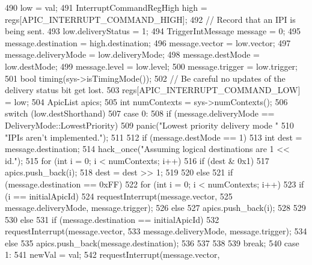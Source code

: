 \begin{DoxyCode}
{{{490             low = val;
491             InterruptCommandRegHigh high = regs[APIC_INTERRUPT_COMMAND_HIGH];
492             // Record that an IPI is being sent.
493             low.deliveryStatus = 1;
494             TriggerIntMessage message = 0;
495             message.destination = high.destination;
496             message.vector = low.vector;
497             message.deliveryMode = low.deliveryMode;
498             message.destMode = low.destMode;
499             message.level = low.level;
500             message.trigger = low.trigger;
501             bool timing(sys->isTimingMode());
502             // Be careful no updates of the delivery status bit get lost.
503             regs[APIC_INTERRUPT_COMMAND_LOW] = low;
504             ApicList apics;
505             int numContexts = sys->numContexts();
506             switch (low.destShorthand) {
507               case 0:
508                 if (message.deliveryMode == DeliveryMode::LowestPriority) {
509                     panic("Lowest priority delivery mode "
510                             "IPIs aren't implemented.\n");
511                 }
512                 if (message.destMode == 1) {
513                     int dest = message.destination;
514                     hack_once("Assuming logical destinations are 1 << id.\n");
515                     for (int i = 0; i < numContexts; i++) {
516                         if (dest & 0x1)
517                             apics.push_back(i);
518                         dest = dest >> 1;
519                     }
520                 } else {
521                     if (message.destination == 0xFF) {
522                         for (int i = 0; i < numContexts; i++) {
523                             if (i == initialApicId) {
524                                 requestInterrupt(message.vector,
525                                         message.deliveryMode, message.trigger);
526                             } else {
527                                 apics.push_back(i);
528                             }
529                         }
530                     } else {
531                         if (message.destination == initialApicId) {
532                             requestInterrupt(message.vector,
533                                     message.deliveryMode, message.trigger);
534                         } else {
535                             apics.push_back(message.destination);
536                         }
537                     }
538                 }
539                 break;
540               case 1:
541                 newVal = val;
542                 requestInterrupt(message.vector,
}}}}
\end{DoxyCode}
